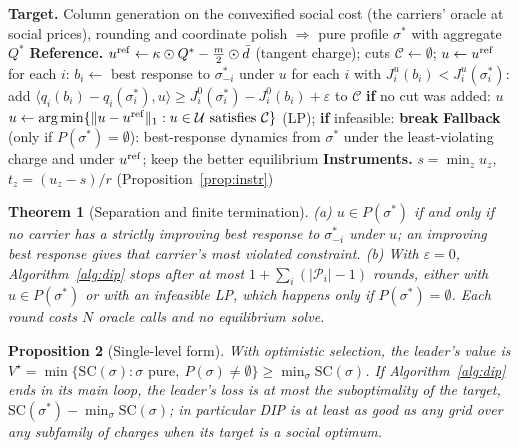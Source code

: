 \documentclass[preprint,11pt]{elsarticle}
\newtheorem{theorem}{Theorem}
\newtheorem{proposition}[theorem]{Proposition}
\theoremstyle{definition}
\theoremstyle{remark}
\newcommand{\ip}[2]{\langle #1,#2\rangle}
\begin{document}
\begin{algorithm}[t]
\caption{DIP: dual implementation pricing}\label{alg:dip}
\begin{algorithmic}[1]
\State \textbf{Target.} Column generation on the convexified social cost (the carriers' oracle at social prices), rounding and coordinate polish $\Rightarrow$ pure profile $\sigma^*$ with aggregate $Q^*$
\State \textbf{Reference.} $u^{\rm ref}\gets\kappa\odot Q^*-\tfrac m2\odot\bar d$ (tangent charge); cuts $\mathcal C\gets\emptyset$; $u\gets u^{\rm ref}$
\Repeat
  \State for each $i$: $b_i\gets$ best response to $\sigma^*_{-i}$ under $u$ 
  \State for each $i$ with $J^u_i(b_i)<J^u_i(\sigma^*_i)$: add $\ip{q_i(b_i)-q_i(\sigma^*_i)}{u}\ge J^0_i(\sigma^*_i)-J^0_i(b_i)+\varepsilon$ to $\mathcal C$
  \State \textbf{if} no cut was added: \Return $u$ 
  \State $u\gets\arg\min\{\|u-u^{\rm ref}\|_1:u\in\mathcal U\text{ satisfies }\mathcal C\}$ (LP); \textbf{if} infeasible: \textbf{break}
\Until{}
\State \textbf{Fallback} (only if $P(\sigma^*)=\emptyset$): best-response dynamics from $\sigma^*$ under the least-violating charge and under $u^{\rm ref}$; keep the better equilibrium
\State \textbf{Instruments.} $s=\min_zu_z$, $t_z=(u_z-s)/r$ (Proposition~\ref{prop:instr})
\end{algorithmic}
\end{algorithm}

\begin{theorem}[Separation and finite termination]\label{thm:cut}
(a) $u\in P(\sigma^*)$ if and only if no carrier has a strictly improving best response to $\sigma^*_{-i}$ under $u$; an improving best response gives that carrier's most violated constraint. (b) With $\varepsilon=0$, Algorithm~\ref{alg:dip} stops after at most $1+\sum_i(|\mathcal P_i|-1)$ rounds, either with $u\in P(\sigma^*)$ or with an infeasible LP, which happens only if $P(\sigma^*)=\emptyset$. Each round costs $N$ oracle calls and no equilibrium solve.
\end{theorem}

\begin{proposition}[Single-level form]\label{prop:opt}
With optimistic selection, the leader's value is $V^\star=\min\{\mathrm{SC}(\sigma):\sigma\text{ pure},\ P(\sigma)\ne\emptyset\}\ge\min_\sigma\mathrm{SC}(\sigma)$. If Algorithm~\ref{alg:dip} ends in its main loop, the leader's loss is at most the suboptimality of the target, $\mathrm{SC}(\sigma^*)-\min_\sigma\mathrm{SC}(\sigma)$; in particular DIP is at least as good as any grid over any subfamily of charges when its target is a social optimum.
\end{proposition}
\end{document}
